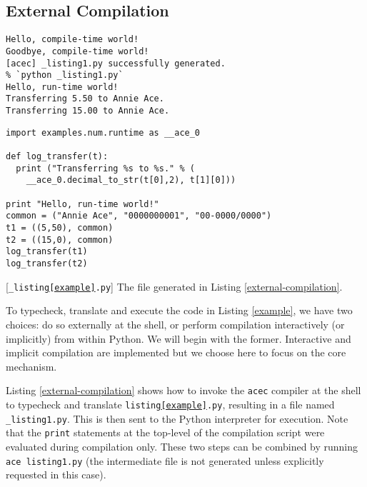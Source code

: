 {\subsection{External Compilation}\label{compilation} 
\begin{codelisting}
\begin{lstlisting}[style=Bash]
% `acec listing1.py`
Hello, compile-time world!
Goodbye, compile-time world!
[acec] _listing1.py successfully generated.
% `python _listing1.py`
Hello, run-time world!
Transferring 5.50 to Annie Ace.
Transferring 15.00 to Annie Ace.
\end{lstlisting}
\caption{Compiling \texttt{listing\ref{example}.py} using \texttt{acec}. Both steps can be performed at once by writing \lstinline[style=Bash]{`ace listing1.py`} (line 3 will not be printed with this command).}
\label{external-compilation}
\end{codelisting}
\begin{codelisting}[t]
\begin{lstlisting}
import examples.num.runtime as __ace_0

def log_transfer(t):
  print ("Transferring %s to %s." % (
    __ace_0.decimal_to_str(t[0],2), t[1][0]))

print "Hello, run-time world!"
common = ("Annie Ace", "0000000001", "00-0000/0000")
t1 = ((5,50), common)
t2 = ((15,0), common)
log_transfer(t1)
log_transfer(t2)
\end{lstlisting}
\caption{[\texttt{\_listing\ref{example}.py}] The file generated in Listing \ref{external-compilation}.}
\label{example-out}
\end{codelisting}

To typecheck, translate and execute the code in Listing \ref{example}, we have two choices: do so externally at the shell, or perform compilation interactively (or implicitly) from within Python. We will begin with the former. Interactive and implicit compilation are implemented but we choose here to focus on the core mechanism.%

Listing \ref{external-compilation} shows how to invoke the \verb|acec| compiler at the shell to typecheck and translate \texttt{listing\ref{example}.py}, resulting in a file named \verb|_listing1.py|. This is then sent to the  Python interpreter for execution. Note that the {\texttt{print}} statements at the top-level of the  compilation script were evaluated during compilation only. These two steps can be combined by running \verb|ace listing1.py| (the intermediate file is not generated unless explicitly requested in this case).

}
